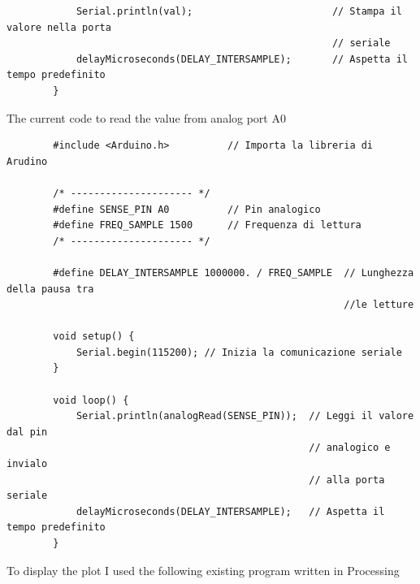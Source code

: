 \documentclass[a4paper, 10pt, final]{article} %
\newcommand{\parenciteit}[2]{\textit{\parencite[#1]{#2}}} %
\begin{document}
\begin{verbatim}
            Serial.println(val);                        // Stampa il valore nella porta
                                                        // seriale
            delayMicroseconds(DELAY_INTERSAMPLE);       // Aspetta il tempo predefinito
        }
    \end{verbatim}

    \noindent The current code to read the value from analog port A0
    \begin{verbatim}
        #include <Arduino.h>          // Importa la libreria di Arudino

        /* --------------------- */
        #define SENSE_PIN A0          // Pin analogico
        #define FREQ_SAMPLE 1500      // Frequenza di lettura
        /* --------------------- */

        #define DELAY_INTERSAMPLE 1000000. / FREQ_SAMPLE  // Lunghezza della pausa tra
                                                          //le letture

        void setup() {
            Serial.begin(115200); // Inizia la comunicazione seriale
        }

        void loop() {
            Serial.println(analogRead(SENSE_PIN));  // Leggi il valore dal pin 
                                                    // analogico e invialo
                                                    // alla porta seriale
            delayMicroseconds(DELAY_INTERSAMPLE);   // Aspetta il tempo predefinito
        }
    \end{verbatim}

    To display the plot I used the following existing program written in Processing \parenciteit{}{ProcessingGrapher:Software}
\end{document}
